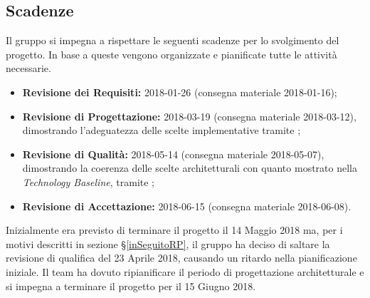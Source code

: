 \subsection{Scadenze} \label{scadenze}

    \label{subsec:scadenze}

        Il gruppo \GroupName{} si impegna a rispettare le seguenti scadenze per lo svolgimento del progetto.
        In base a queste vengono organizzate e pianificate tutte le attività necessarie.

        \begin{itemize}
            \item \textbf{Revisione dei Requisiti:}
                2018-01-26 (consegna materiale 2018-01-16);
            \item \textbf{Revisione di Progettazione:}
                2018-03-19 (consegna materiale 2018-03-12), dimostrando l'adeguatezza delle scelte implementative
                tramite ;
            \item \textbf{Revisione di Qualità:}
                2018-05-14 (consegna materiale 2018-05-07), dimostrando la coerenza delle scelte
                architetturali con quanto mostrato nella \emph{Technology Baseline},
                tramite ;
            \item \textbf{Revisione di Accettazione:}
                2018-06-15 (consegna materiale 2018-06-08).
        \end{itemize}
        
        Inizialmente era previsto di terminare il progetto il 14 Maggio 2018 ma, per i motivi descritti in sezione §\ref{inSeguitoRP}, il
        gruppo ha deciso di saltare la revisione di qualifica del 23 Aprile 2018, causando un ritardo nella pianificazione iniziale. 
        Il team ha dovuto ripianificare il periodo di progettazione architetturale e si impegna a terminare il progetto per il 15 Giugno
        2018.
